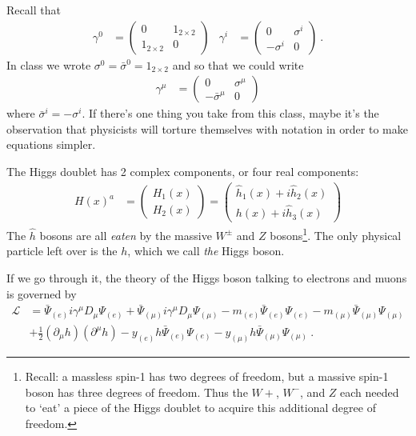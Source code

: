 \documentclass[12pt]{article}
\begin{document}
Recall that
\begin{align}
	\gamma^0 &= 
	\begin{pmatrix}
		0 & 1_{2\times 2} \\
		1_{2\times 2} & 0 
	\end{pmatrix}
	&
	\gamma^i &= 
	\begin{pmatrix}
		0 & \sigma^i \\
		-\sigma^i & 0 
	\end{pmatrix} 
	\ .
\end{align}
In class we wrote $\sigma^0 = \bar \sigma^0 = 1_{2\times 2}$ and so that we could write 
\begin{align}
	\gamma^\mu &= 
	\begin{pmatrix}
		0 & \sigma^\mu \\
		-\bar\sigma^\mu & 0 
	\end{pmatrix} 
\end{align}
where $\bar\sigma^i = - \sigma^i$. If there's one thing you take from this class, maybe it's the observation that physicists will torture themselves with notation in order to make equations simpler.

The Higgs doublet has 2 complex components, or four real components:
\begin{align}
	H(x)^a &= 
	\begin{pmatrix}
		H_1(x) \\
		H_2(x)
	\end{pmatrix}
	=
	\begin{pmatrix}
		\hat h_1(x) + i\hat h_2(x)  \\
		h(x) + i \hat h_3(x)
	\end{pmatrix}
\end{align}
The $\hat h$ bosons are all \textit{eaten} by the massive $W^\pm$ and $Z$ bosons\footnote{Recall: a massless spin-1 has two degrees of freedom, but a massive spin-1 boson has three degrees of freedom. Thus the $W+$, $W^-$, and $Z$ each needed to `eat' a piece of the Higgs doublet to acquire this additional degree of freedom.}. The only physical particle left over is the $h$, which we call \emph{the} Higgs boson.

If we go through it, the theory of the Higgs boson talking to electrons and muons is governed by
\begin{align}
	\mathcal L 
	& = 
	\bar \Psi_{(e)} 
	i \gamma^\mu 
	D_\mu
	\Psi_{(e)}
	+
	\bar \Psi_{(\mu)} 
	i \gamma^\mu 
	D_\mu
	\Psi_{(\mu)} 
	- m_{(e)} \bar \Psi_{(e)}\Psi_{(e)}
	- m_{(\mu)} \bar \Psi_{(\mu)}
	\Psi_{(\mu)}
	\\
	&
	+\frac 12(\partial_\mu h)(\partial^\mu h)
	- y_{(e)} h \bar \Psi_{(e)} 	\Psi_{(e)}
	- y_{(\mu)} h \bar \Psi_{(\mu)}  \Psi_{(\mu)} 
	\ .
\end{align}
\end{document}
